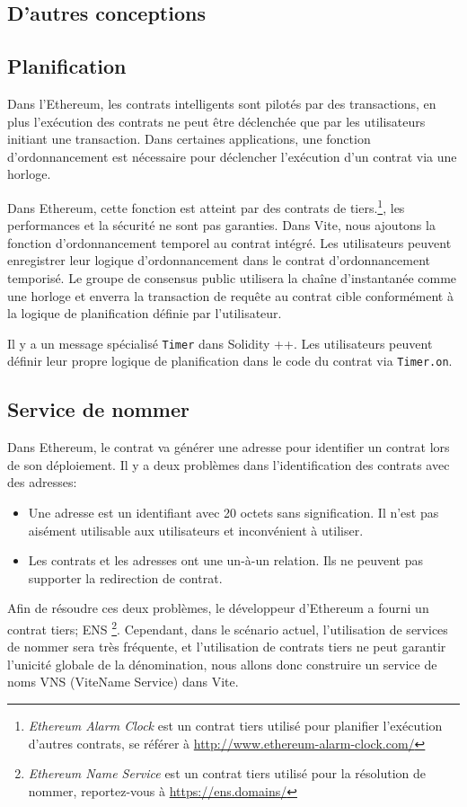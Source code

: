 \documentclass[UTF8,nofonts]{article}
\begin{document}
\begin{multicols}{2}
\section{D'autres conceptions}
\subsection{Planification}
Dans l'Ethereum, les contrats intelligents sont pilotés par des transactions, en plus l'exécution des contrats ne peut être déclenchée que par les utilisateurs initiant une transaction. Dans certaines applications, une fonction d'ordonnancement est nécessaire pour déclencher l'exécution d'un contrat via une horloge.

Dans Ethereum, cette fonction est atteint par des contrats de tiers.\footnote{\textit{Ethereum Alarm Clock} est un contrat tiers utilisé pour planifier l'exécution d'autres contrats, se référer à \url{http://www.ethereum-alarm-clock.com/}}, les performances et la sécurité ne sont pas garanties. Dans Vite, nous ajoutons la fonction d'ordonnancement temporel au contrat intégré. Les utilisateurs peuvent enregistrer leur logique d'ordonnancement dans le contrat d'ordonnancement temporisé. Le groupe de consensus public utilisera la chaîne d'instantanée comme une horloge et enverra la transaction de requête au contrat cible conformément à la logique de planification définie par l'utilisateur.

Il y a un message spécialisé \texttt{Timer} dans Solidity ++. Les utilisateurs peuvent définir leur propre logique de planification dans le code du contrat via \texttt{Timer.on}.

\subsection{Service de nommer}\label{sec:vns}
Dans Ethereum, le contrat va générer une adresse pour identifier un contrat lors de son déploiement. Il y a deux problèmes dans l'identification des contrats avec des adresses:
\begin{itemize}
	\item	Une adresse est un identifiant avec 20 octets sans signification. Il n'est pas aisément utilisable aux utilisateurs et inconvénient à utiliser.
	\item	Les contrats et les adresses ont une un-à-un relation. Ils ne peuvent pas supporter la redirection de contrat.
\end{itemize}

Afin de résoudre ces deux problèmes, le développeur d'Ethereum a fourni un contrat tiers; ENS \footnote{\textit{Ethereum Name Service} est un contrat tiers utilisé pour la résolution de nommer, reportez-vous à \url{https://ens.domains/}}. Cependant, dans le scénario actuel, l'utilisation de services de nommer sera très fréquente, et l'utilisation de contrats tiers ne peut garantir l'unicité globale de la dénomination, nous allons donc construire un service de noms VNS (ViteName Service) dans Vite.


\end{multicols}
\end{document}

